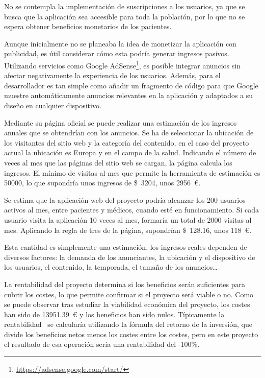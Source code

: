 No se contempla la implementación de suscripciones a los usuarios, ya que se busca que la aplicación sea accesible para toda la población, por lo que no se espera obtener beneficios monetarios de los pacientes.

Aunque inicialmente no se planeaba la idea de monetizar la aplicación con publicidad, es útil considerar cómo esta podría generar ingresos pasivos. Utilizando servicios como Google AdSense\footnote{\url{https://adsense.google.com/start/}}, es posible integrar anuncios sin afectar negativamente la experiencia de los usuarios.
Además, para el desarrollador es tan simple como añadir un fragmento de código para que Google muestre automáticamente anuncios relevantes en la aplicación y adaptados a su diseño en cualquier dispositivo.

Mediante su página oficial se puede realizar una estimación de los ingresos anuales que se obtendrían con los anuncios. Se ha de seleccionar la ubicación de los visitantes del sitio web y la categoría del contenido, en el caso del proyecto actual la ubicación es Europa y en el campo de la salud. Indicando el número de veces al mes que las páginas del sitio web se cargan, la página calcula los ingresos. El mínimo de visitas al mes que permite la herramienta de estimación es 50000, lo que supondría unos ingresos de \$~3204, unos 2956~€.

Se estima que la aplicación web del proyecto podría alcanzar los 200 usuarios activos al mes, entre pacientes y médicos, cuando esté en funcionamiento. Si cada usuario visita la aplicación 10 veces al mes, formaría un total de 2000 visitas al mes. Aplicando la regla de tres de la página, supondrían \$~128.16, unos 118~€.

Esta cantidad es simplemente una estimación, los ingresos reales dependen de diversos factores: la demanda de los anunciantes, la ubicación y el dispositivo de los usuarios, el contenido, la temporada, el tamaño de los anuncios\ldots




La rentabilidad del proyecto determina si los beneficios serán suficientes para cubrir los costes, lo que permite confirmar si el proyecto será viable o no. Como se puede observar tras estudiar la viabilidad económica del proyecto, los costes han sido de 13951.39~€ y los beneficios han sido nulos. Típicamente la rentabilidad~\cite{rentabilidad} se calcularía utilizando la fórmula del retorno de la inversión, que divide los beneficios netos menos los costes entre los costes, pero en este proyecto el resultado de esa operación sería una rentabilidad del -100\%.

